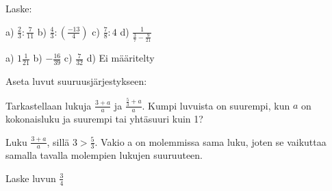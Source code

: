 \begin{tehtavasivu}
\begin{tehtava} Laske:

a) $\frac{2}{3} : \frac{7}{11}$ \qquad b) $\frac{4}{3}:\left(\frac{-13}{4}\right)$ \qquad c) $\frac{7}{8}:4$  \qquad d) $\frac{1}{\frac{3}{7}-\frac{9}{21}}$
\begin{vastaus}
a) $1\frac{1}{21}$ \qquad b) $-\frac{16}{39}$ \qquad c) $\frac{7}{32}$ \qquad d) Ei määritelty
\end{vastaus}
\end{tehtava}

\begin{tehtava}
Aseta luvut suuruusjärjestykseen:
\begin{alakohdat}
\end{alakohdat}
\begin{vastaus}
\begin{alakohdat}
\end{alakohdat}
\end{vastaus}
\end{tehtava}

\begin{tehtava}
 Tarkastellaan lukuja $\frac{3+a}{a}$ ja $\frac{\frac{5}{3}+a}{a}$. Kumpi luvuista on suurempi, kun \(a\) on kokonaisluku ja suurempi tai yhtäsuuri kuin 1?
 \begin{vastaus}
  Luku $\frac{3+a}{a}$, sillä $3>\frac{5}{3}$. Vakio a on molemmissa sama luku, joten se vaikuttaa samalla tavalla molempien lukujen suuruuteen.
 \end{vastaus}
\end{tehtava}


\begin{tehtava}
Laske luvun $\frac{3}{4}$
	\begin{alakohdat}
	\end{alakohdat}
	\begin{vastaus}
		\begin{alakohdat}
			\alakohta{$\frac{-3}{4}$}
			\alakohta{$\frac{4}{3}$}
			\alakohta{$\frac{3}{4}$}
			\alakohta{$-\frac{4}{3}$}
			\alakohta{$-\frac{4}{3}$}
			\alakohta{$\frac{3}{4}$}
		\end{alakohdat}
	\end{vastaus}
\end{tehtava}



\end{tehtavasivu}
